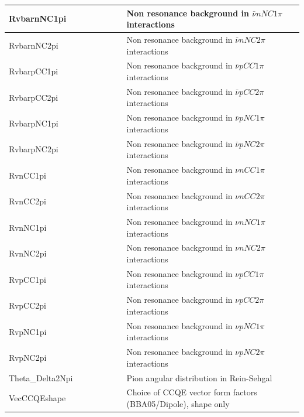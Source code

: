 {\begin{longtable}{|p{0.4\linewidth}|p{0.6\linewidth}|}
 RvbarnNC1pi & Non resonance background in $ \bar{\nu} n NC 1\pi$ interactions \\ \hline
 RvbarnNC2pi & Non resonance background in $ \bar{\nu} n NC 2\pi$ interactions \\ \hline
 RvbarpCC1pi & Non resonance background in $ \bar{\nu} p CC 1\pi$ interactions \\ \hline
 RvbarpCC2pi & Non resonance background in $ \bar{\nu} p CC2\pi$ interactions \\ \hline
 RvbarpNC1pi & Non resonance background in $ \bar{\nu} p NC1\pi$ interactions \\ \hline
 RvbarpNC2pi & Non resonance background in $ \bar{\nu} p NC2\pi$ interactions \\ \hline
 RvnCC1pi & Non resonance background in $\nu n CC1\pi$ interactions \\ \hline
 RvnCC2pi & Non resonance background in $\nu n CC2\pi$ interactions \\ \hline
 RvnNC1pi & Non resonance background in $\nu n NC1\pi$ interactions \\ \hline
 RvnNC2pi & Non resonance background in $\nu n NC2\pi$ interactions  \\ \hline
 RvpCC1pi & Non resonance background in $\nu p CC1\pi$ interactions \\ \hline
 RvpCC2pi & Non resonance background in $\nu p CC2\pi$ interactions  \\ \hline
 RvpNC1pi & Non resonance background in $\nu p NC1\pi$ interactions \\ \hline
 RvpNC2pi & Non resonance background in $\nu p NC2\pi$ interactions \\ \hline
 Theta\_Delta2Npi & Pion angular distribution in Rein-Sehgal \\ \hline
 VecCCQEshape & Choice of CCQE vector form factors (BBA05/Dipole), shape only  \\ \hline
\end{longtable}
{
\label{genie_reweight_knobs}
}
\clearpage

}
